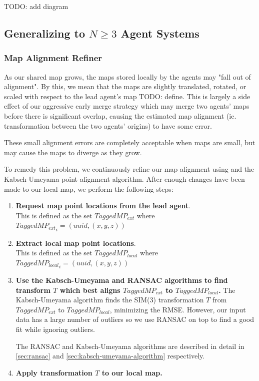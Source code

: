 TODO: add diagram

\subsection{Generalizing to $N \geq 3$ Agent Systems}
\label{sec:generalizing-to-n-2-agent-systems}

\subsubsection{Map Alignment Refiner}
\label{sec:map-alignment-refiner}
As our shared map grows, the maps stored locally by the agents may "fall out of alignment". By this, we mean that the maps are slightly translated, rotated, or scaled with respect to the lead agent's map TODO: define. This is largely a side effect of our aggressive early merge strategy which may merge two agents' maps before there is significant overlap, causing the estimated map alignment (ie. transformation between the two agents' origins) to have some error.

These small alignment errors are completely acceptable when maps are small, but may cause the maps to diverge as they grow.

To remedy this problem, we continuously refine our map alignment using  and the Kabsch-Umeyama point alignment algorithm. After enough changes have been made to our local map, we perform the following steps:

\begin{enumerate}
    \item \textbf{Request map point locations from the lead agent}. \\
          This is defined as the set $TaggedMP_{ext}$ where ${TaggedMP_{ext}}_i = (uuid, (x, y, z))$
    \item \textbf{Extract local map point locations}. \\
          This is defined as the set $TaggedMP_{local}$ where ${TaggedMP_{local}}_i = (uuid, (x, y, z))$
    \item \textbf{Use the Kabsch-Umeyama and RANSAC algorithms to find transform $T$ which best aligns $TaggedMP_{ext}$ to $TaggedMP_{local}$.}
          The Kabsch-Umeyama algorithm finds the SIM(3) transformation $T$ from $TaggedMP_{ext}$ to $TaggedMP_{local}$, minimizing the RMSE. However, our input data has a large number of outliers so we use RANSAC on top to find a good fit while ignoring outliers.

          The RANSAC and Kabsch-Umeyama algorithms are described in detail in \autoref{sec:ransac} and \autoref{sec:kabsch-umeyama-algorithm} respectively.
    \item \textbf{Apply transformation $T$ to our local map.}
\end{enumerate}

